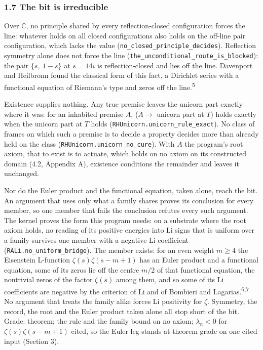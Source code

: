 \documentclass[10pt]{article}
\begin{document}
\hypertarget{the-bit-is-irreducible}{%
\subsubsection{1.7 The bit is
irreducible}\label{the-bit-is-irreducible}}

Over \(\mathbb{C}\), no principle shared by every reflection-closed
configuration forces the line: whatever holds on all closed
configurations also holds on the off-line pair configuration, which
lacks the value
(\texttt{no\_\allowbreak{}closed\_\allowbreak{}principle\_\allowbreak{}decides}).
Reflection symmetry alone does not force the line
(\texttt{the\_\allowbreak{}unconditional\_\allowbreak{}route\_\allowbreak{}is\_\allowbreak{}blocked}):
the pair \(\{s,\ 1 - \bar{s}\}\) at \(s = 14i\) is reflection-closed and
lies off the line. Davenport and Heilbronn found the classical form of
this fact, a Dirichlet series with a functional equation of Riemann's
type and zeros off the line.\textsuperscript{5}

Existence supplies nothing. Any true premise leaves the unicorn part
exactly where it was: for an inhabited premise \(A\), (\(A \to\) unicorn
part at \(T\)) holds exactly when the unicorn part at \(T\) holds
(\texttt{RHUnicorn.\allowbreak{}unicorn\_\allowbreak{}rule\_\allowbreak{}exact}).
No class of frames on which such a premise is to decide a property
decides more than already held on the class
(\texttt{RHUnicorn.\allowbreak{}unicorn\_\allowbreak{}no\_\allowbreak{}cure}).
With \(A\) the program's root axiom, that to exist is to actuate, which
holds on no axiom on its constructed domain (4.2, Appendix A), existence
conditions the remainder and leaves it unchanged.

Nor do the Euler product and the functional equation, taken alone, reach
the bit. An argument that uses only what a family shares proves its
conclusion for every member, so one member that fails the conclusion
refutes every such argument. The kernel proves the form this program
needs: on a substrate where the root axiom holds, no reading of its
positive energies into Li signs that is uniform over a family survives
one member with a negative Li coefficient
(\texttt{RALi.\allowbreak{}no\_\allowbreak{}uniform\_\allowbreak{}bridge}).
The member exists: for an even weight \(m \ge 4\) the Eisenstein
L-function \(\zeta(s)\zeta(s-m+1)\) has an Euler product and a
functional equation, some of its zeros lie off the centre \(m/2\) of
that functional equation, the nontrivial zeros of the factor
\(\zeta(s)\) among them, and so some of its Li coefficients are negative
by the criterion of Li and of Bombieri and
Lagarias.\textsuperscript{6,7} No argument that treats the family alike
forces Li positivity for \(\zeta\). Symmetry, the record, the root and
the Euler product taken alone all stop short of the bit. Grade: theorem;
the rule and the family bound on no axiom; \(\lambda_n < 0\) for
\(\zeta(s)\zeta(s-m+1)\) cited, so the Euler leg stands at theorem grade
on one cited input (Section 3).
\end{document}

